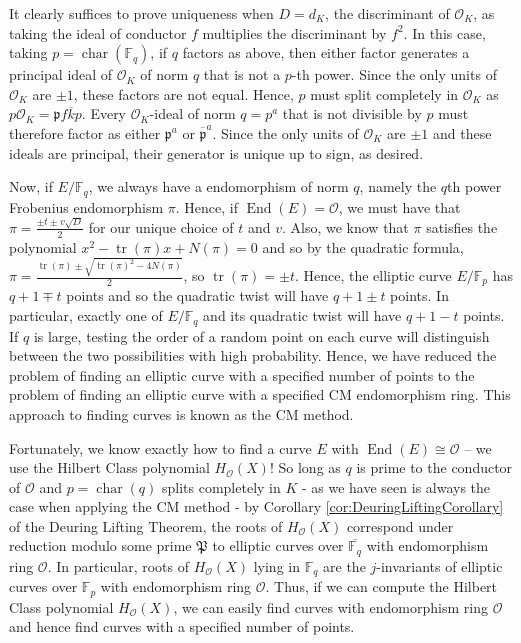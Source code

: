 \documentclass{amsart}
\theoremstyle{definition}
\theoremstyle{remark}
\numberwithin{equation}{section}
\newcommand{\cO}{\mathcal O}
\newcommand{\fkp}{\mathfrak p}
\newcommand{\fkP}{\mathfrak{P}}
\newcommand{\bbF}{\mathbb F}
\DeclareMathOperator{\Char}{char}
\DeclareMathOperator{\End}{End}
\DeclareMathOperator{\tr}{tr}
\begin{document}
 It clearly suffices to prove uniqueness when $D = d_{K}$, the discriminant of $\cO_{K}$, as taking the ideal of conductor $f$ multiplies the discriminant by $f^2$. In this case, taking $p = \Char(\bbF_q)$, if $q$ factors as above, then either factor generates a principal ideal of $\cO_K$ of norm $q$ that is not a $p$-th power. Since the only units of $\cO_{K}$ are $\pm 1$, these factors are not equal. Hence, $p$ must split completely in $\cO_{K}$ as $p \cO_{K} = \fkp \overline{fkp}$. Every $\cO_{K}$-ideal of norm $q = p^a$ that is not divisible by $p$ must therefore factor as either $\fkp^{a}$ or $\overline{\fkp}^{a}$. Since the only units of $\cO_{K}$ are $\pm 1$ and these ideals are principal, their generator is unique up to sign, as desired. 
  
 Now, if $E/\bbF_{q}$, we always have a endomorphism of norm $q$, namely the $q$th power Frobenius endomorphism $\pi$. Hence, if $\End(E) = \cO$, we must have that $\pi = \frac{\pm t \pm v\sqrt{D}}{2}$ for our unique choice of $t$ and $v$. Also, we know that $\pi$ satisfies the polynomial $x^2 - \tr(\pi)x + N(\pi) = 0$ and so by the quadratic formula, $\pi = \frac{\tr(\pi) \pm \sqrt{\tr(\pi)^2 - 4N(\pi)}}{2}$, so $\tr(\pi) = \pm t$. Hence, the elliptic curve $E/\bbF_{p}$ has $q + 1 \mp t$ points and so the quadratic twist will have $q + 1 \pm t$ points. In particular, exactly one of $E/\bbF_{q}$ and its quadratic twist will have $q + 1 - t$ points. If $q$ is large, testing the order of a random point on each curve will distinguish between the two possibilities with high probability. Hence, we have reduced the problem of finding an elliptic curve with a specified number of points to the problem of finding an elliptic curve with a specified CM endomorphism ring. This approach to finding curves is known as the CM method.
 
 Fortunately, we know exactly how to find a curve $E$ with $\End(E) \cong \cO$ -- we use the Hilbert Class polynomial $H_{\cO}(X)$! So long as $q$ is prime to the conductor of $\cO$ and $p = \Char(q)$ splits completely in $K$ - as we have seen is always the case when applying the CM method - by Corollary \ref{cor:DeuringLiftingCorollary} of the Deuring Lifting Theorem, the roots of $H_{\cO}(X)$ correspond under reduction modulo some prime $\fkP$ to elliptic curves over $\overline{\bbF_{q}}$ with endomorphism ring $\cO$. In particular, roots of $H_{\cO}(X)$ lying in $\bbF_{q}$ are the $j$-invariants of elliptic curves over $\bbF_{p}$ with endomorphism ring $\cO$. Thus, if we can compute the Hilbert Class polynomial $H_{\cO}(X)$, we can easily find curves with endomorphism ring $\cO$ and hence find curves with a specified number of points.
 
\end{document}
